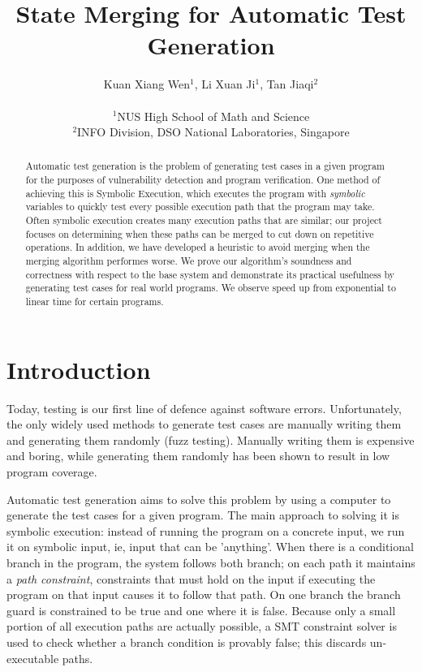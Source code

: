 \documentclass[12pt,a4paper]{article}
\title{State Merging for Automatic Test Generation}
\date{}
\author{
Kuan Xiang Wen$^{1}$, Li Xuan Ji$^{1}$, Tan Jiaqi$^{2}$\\
\vspace{1 mm} \\
\small{$^{1}$NUS High School of Math and Science}\\
\small{$^{2}$INFO Division, DSO National Laboratories, Singapore}
}
\begin{document}
\begin{abstract}
Automatic test generation is the problem of generating test cases in a given program for the purposes of vulnerability detection and program verification. One method of achieving this is Symbolic Execution, which executes the program with \emph{symbolic} variables to quickly test every possible execution path that the program may take. Often symbolic execution creates many execution paths that are similar; our project focuses on determining when these paths can be merged to cut down on repetitive operations. In addition, we have developed a heuristic to avoid merging when the merging algorithm performes worse. We prove our algorithm's soundness and correctness with respect to the base system and demonstrate its practical usefulness by generating test cases for real world programs. We observe speed up from exponential to linear time for certain programs.
\end{abstract}

\section{Introduction}
Today, testing is our first line of defence against software errors. Unfortunately, the only widely used methods to generate test cases are manually writing them and generating them randomly (fuzz testing). Manually writing them is expensive and boring, while generating them randomly has been shown to result in low program coverage. 

Automatic test generation aims to solve this problem by using a computer to generate the test cases for a given program. The main approach to solving it is symbolic execution: instead of running the program on a concrete input, we run it on symbolic input, ie, input that can be 'anything'. When there is a conditional branch in the program, the system follows both branch; on each path it maintains a \emph{path constraint}, constraints that must hold on the input if executing the program on that input causes it to follow that path. On one branch the branch guard is constrained to be true and one where it is false. Because only a small portion of all execution paths are actually possible, a SMT constraint solver is used to check whether a branch condition is provably false; this discards un-executable paths.
\end{document}
